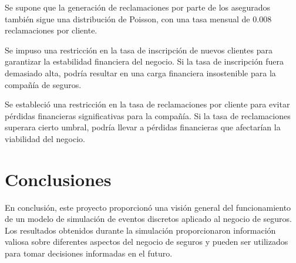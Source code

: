 \documentclass{article}
\begin{document}
    Se supone que la generación de reclamaciones por parte de los asegurados también sigue una distribución de Poisson, con una tasa mensual de 0.008 reclamaciones por cliente.

    Se impuso una restricción en la tasa de inscripción de nuevos clientes para garantizar la estabilidad financiera del negocio. Si la tasa de inscripción fuera demasiado alta, podría resultar en una carga financiera insostenible para la compañía de seguros.

    Se estableció una restricción en la tasa de reclamaciones por cliente para evitar pérdidas financieras significativas para la compañía. Si la tasa de reclamaciones superara cierto umbral, podría llevar a pérdidas financieras que afectarían la viabilidad del negocio.
\section{Conclusiones}
En conclusión, este proyecto proporcionó una visión general del funcionamiento de un modelo de simulación de eventos discretos aplicado al negocio de seguros. Los resultados obtenidos durante la simulación proporcionaron información valiosa sobre diferentes aspectos del negocio de seguros y pueden ser utilizados para tomar decisiones informadas en el futuro.
\end{document}
